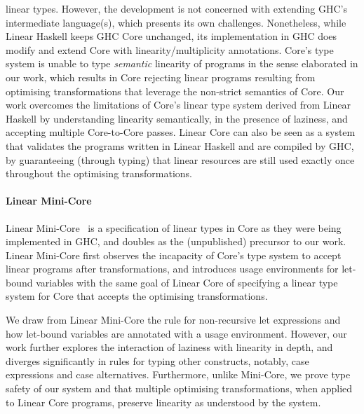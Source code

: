 \documentclass[acmsmall,review,anonymous]{acmart}
\begin{document}
linear types. However, the development is
not concerned with extending GHC's intermediate language(s),
which presents its own challenges. 
%
Nonetheless, while Linear Haskell keeps GHC Core unchanged, its
implementation in GHC does modify and extend Core with linearity/multiplicity
annotations. Core's type system is unable to type \emph{semantic} linearity of
programs in the sense elaborated in our work, which results in Core
rejecting linear programs resulting from optimising transformations that
leverage the non-strict semantics of Core.
%
Our work overcomes the limitations of Core's linear type system derived from
Linear Haskell by understanding linearity semantically, in the presence of laziness,
and accepting multiple Core-to-Core passes.
Linear Core can
also be seen as a system that validates the programs written in Linear Haskell
and are compiled by GHC, by guaranteeing (through typing) that linear resources
are still used exactly once throughout the optimising transformations.

\paragraph{Linear Mini-Core\label{sec:linear-mini-core}}

Linear Mini-Core~\cite{cite:minicore} is a specification of linear types in
Core as they were being implemented in GHC, and doubles as the (unpublished)
precursor to our work. Linear Mini-Core first observes the incapacity of
Core's type system to accept linear programs after transformations, and 
introduces usage environments for let-bound variables with the same goal of
Linear Core of specifying a linear type system for Core that accepts the
optimising transformations.

We draw from Linear Mini-Core the rule for non-recursive let expressions and
how let-bound variables are annotated with a usage environment. However, our
work further explores the interaction of laziness with linearity in depth, and
diverges significantly in rules for typing other constructs, notably, case expressions and
case alternatives. Furthermore, unlike Mini-Core, we prove type safety of our
system and that multiple optimising transformations, when applied to Linear
Core programs, preserve linearity as understood by the system.

% 
% 
\end{document}
